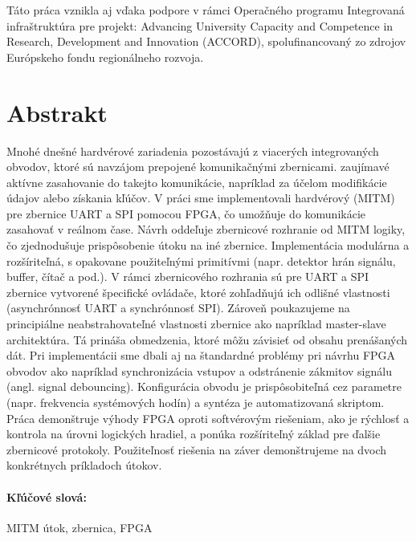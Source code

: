 \documentclass[12pt, twoside]{book}
\begin{document}
Táto práca vznikla aj vďaka podpore v rámci Operačného programu Integrovaná infraštruktúra pre projekt: Advancing University Capacity and Competence in Research, Development and Innovation (ACCORD), spolufinancovaný zo zdrojov Európskeho fondu regionálneho rozvoja.


\newpage 
\section*{Abstrakt}

Mnohé dnešné hardvérové zariadenia pozostávajú z viacerých integrovaných obvodov, ktoré sú navzájom prepojené komunikačnými zbernicami. zaujímavé aktívne zasahovanie do takejto komunikácie, napríklad za účelom modifikácie údajov alebo získania kľúčov. V práci sme implementovali hardvérový  (MITM) pre zbernice UART a SPI pomocou FPGA, čo umožňuje do komunikácie zasahovať v reálnom čase. Návrh oddeľuje zbernicové rozhranie od MITM logiky, čo zjednodušuje prispôsobenie útoku na iné zbernice. Implementácia modulárna a rozšíriteľná, s opakovane použiteľnými primitívmi (napr. detektor hrán signálu, buffer, čítač a pod.). V rámci zbernicového rozhrania sú pre UART a SPI zbernice vytvorené špecifické ovládače, ktoré zohľadňujú ich odlišné vlastnosti (asynchrónnosť UART a synchrónnosť SPI). Zároveň poukazujeme na principiálne neabstrahovateľné vlastnosti zbernice ako napríklad master-slave architektúra. Tá prináša obmedzenia, ktoré môžu závisieť od obsahu prenášaných dát. Pri implementácii sme dbali aj na štandardné problémy pri návrhu FPGA obvodov ako napríklad synchronizácia vstupov a odstránenie zákmitov signálu (angl. signal debouncing). Konfigurácia obvodu je prispôsobiteľná cez parametre (napr. frekvencia systémových hodín) a syntéza je automatizovaná skriptom. Práca demonštruje výhody FPGA oproti softvérovým riešeniam, ako je rýchlosť a kontrola na úrovni logických hradiel, a ponúka rozšíriteľný základ pre ďalšie zbernicové protokoly. Použiteľnosť riešenia na záver demonštrujeme na dvoch konkrétnych príkladoch útokov.

\paragraph*{Kľúčové slová:} MITM útok, zbernica, FPGA


\newpage 
\end{document}
